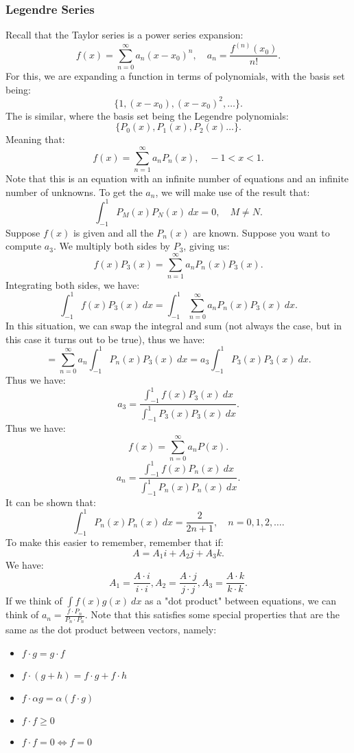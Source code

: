 \documentclass[../main/main.tex]{subfiles}
\begin{document}
\subsubsection{Legendre Series}
Recall that the Taylor series is a power series expansion: \[
	f(x) = \sum_{n=0}^{\infty} a_n (x-x_0)^{n}, \quad a_n = \frac{f^{(n)}(x_0)}{n!}
.\] 
For this, we are expanding a function in terms of polynomials, with the basis set being: \[
	\{1,(x-x_0),(x-x_0)^2,\ldots\} 
.\] 
The  is similar, where the basis set being the Legendre polynomials: \[
	\{P_0(x),P_1(x),P_2(x)\ldots\} 
.\] Meaning that: \[
f(x) = \sum_{n=1}^{\infty} a_n P_n(x), \quad -1<x<1
.\] Note that this is an equation with an infinite number of equations and an infinite number of unknowns.
To get the $a_n$, we will make use of the result that: \[
	\int^1_{-1}P_M(x)P_N(x)~dx = 0,\quad M\neq N
.\] Suppose $f(x) $ is given and all the $P_n(x)$ are known. Suppose you want to compute $a_3$. We multiply both sides by $P_3$, giving us: \[
f(x) P_3(x) = \sum_{n=1}^{\infty} a_n P_n(x) P_3(x)
.\] Integrating both sides, we have: \[
\int^1_{-1}f(x) P_3(x) ~dx = \int^1_{-1}\sum_{n=0}^{\infty} a_n P_n(x) P_3(x)~dx
.\] In this situation, we can swap the integral and sum (not always the case, but in this case it turns out to be true), thus we have: \[
= \sum_{n=0}^{\infty} a_n \int^1_{-1}P_n(x) P_3(x)~dx = a_3 \int^1_{-1}P_3(x)P_3(x) ~dx
.\]  
Thus we have: \[
	a_3 = \frac{\int^1_{-1}f(x)P_3(x)~dx}{\int^1_{-1}P_3(x)P_3(x)~dx}
.\] Thus we have: \[
f(x) = \sum_{n=0}^{\infty} a_nP(x)
.\] \[
a_n = \frac{\int^1_{-1}f(x) P_n(x) ~dx}{\int^1_{-1}P_n(x)P_n(x)~dx}
.\] It can be shown that: \[
\int^1_{-1}P_n(x)P_n(x) ~dx = \frac{2}{2n+1}, \quad n=0,1,2,\ldots
.\] To make this easier to remember, remember that if:  \[
A = A_1 i + A_2 j + A_3 k
.\] We have: \[
A_1 = \frac{A\cdot i}{i\cdot i},  A_2 = \frac{A\cdot j}{j\cdot j},  A_3 = \frac{A\cdot k}{k\cdot k}
.\] If we think of $\int f(x)g(x)~dx$ as a "dot product" between equations, we can think of $a_n = \frac{f\cdot P_n}{P_n\cdot P_n}$. Note that this satisfies some special properties that are the same as the dot product between vectors, namely: 
\begin{itemize}
	\item $f\cdot g = g\cdot f$
	\item $f\cdot (g+h) = f\cdot g + f\cdot  h$
	\item $f\cdot\alpha g = \alpha(f\cdot g)$ 
	\item $f\cdot f\ge 0$
	\item $f\cdot f = 0 \iff f=0$
\end{itemize}
\end{document}
